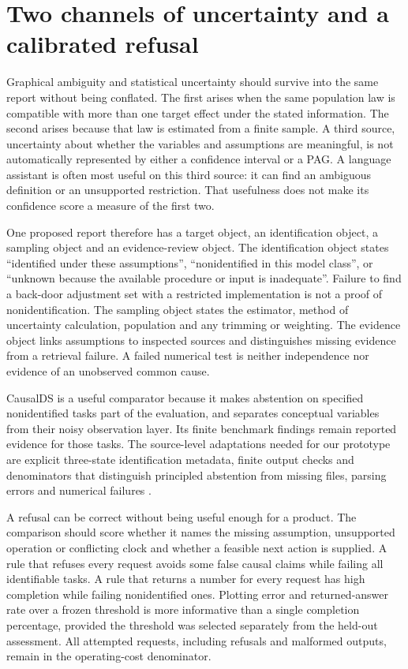 \section{Two channels of uncertainty and a calibrated refusal}

Graphical ambiguity and statistical uncertainty should survive into the same
report without being conflated. The first arises when the same population law
is compatible with more than one target effect under the stated information.
The second arises because that law is estimated from a finite sample. A third
source, uncertainty about whether the variables and assumptions are meaningful,
is not automatically represented by either a confidence interval or a PAG.
A language assistant is often most useful on this third source: it can find an
ambiguous definition or an unsupported restriction. That usefulness does not
make its confidence score a measure of the first two.

One proposed report therefore has a target object, an identification object,
a sampling object and an evidence-review object. The identification object
states ``identified under these assumptions'', ``nonidentified in this model
class'', or ``unknown because the available procedure or input is inadequate''.
Failure to find a back-door adjustment set with a restricted implementation is
not a proof of nonidentification. The sampling object states the estimator,
method of uncertainty calculation, population and any trimming or weighting.
The evidence object links assumptions to inspected sources and distinguishes
missing evidence from a retrieval failure. A failed numerical test is neither
independence nor evidence of an unobserved common cause.

CausalDS is a useful comparator because it makes abstention on specified
nonidentified tasks part of the evaluation, and separates conceptual variables
from their noisy observation layer. Its finite benchmark findings remain
reported evidence for those tasks. The source-level adaptations needed for our
prototype are explicit three-state identification metadata, finite output
checks and denominators that distinguish principled abstention from missing
files, parsing errors and numerical failures
\citep{v12_la_2607_08093,exec14_estimation_sources}.

A refusal can be correct without being useful enough for a product. The
comparison should score whether it names the missing assumption, unsupported
operation or conflicting clock and whether a feasible next action is supplied.
A rule that refuses every request avoids some false causal claims while failing
all identifiable tasks. A rule that returns a number for every request has high
completion while failing nonidentified ones. Plotting error and returned-answer
rate over a frozen threshold is more informative than a single completion
percentage, provided the threshold was selected separately from the held-out
assessment. All attempted requests, including refusals and malformed outputs,
remain in the operating-cost denominator.

